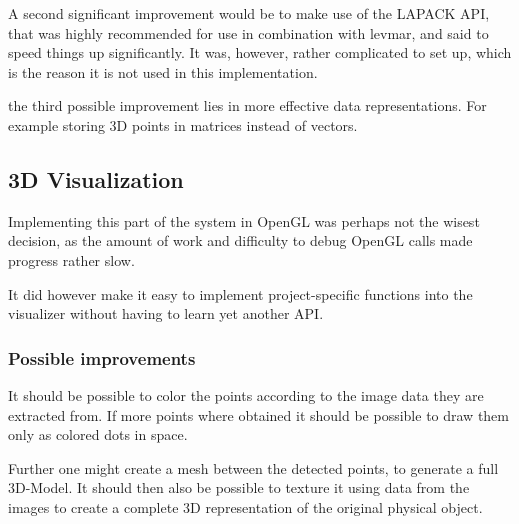 A second significant improvement would be to make use of the LAPACK API, that was highly recommended for use in combination with levmar, and said to speed things up significantly. It was, however, rather complicated to set up, which is the reason it is not used in this implementation.

the third possible improvement lies in more effective data representations. For example storing 3D points in matrices instead of vectors.

\subsection{3D Visualization}
Implementing this part of the system in OpenGL was perhaps not the wisest decision, as the amount of work and difficulty to debug OpenGL calls made progress rather slow.

It did however make it easy to implement project-specific functions into the visualizer without having to learn yet another API.

\subsubsection{Possible improvements}
It should be possible to color the points according to the image data they are extracted from. If more points where obtained it should be possible to draw them only as colored dots in space.

Further one might create a mesh between the detected points, to generate a full 3D-Model. It should then also be possible to texture it using data from the images to create a complete 3D representation of the original physical object.